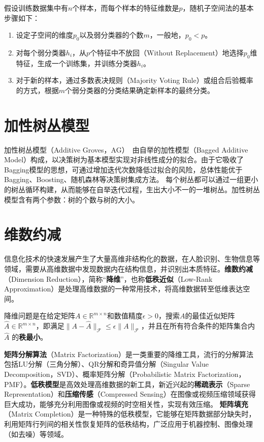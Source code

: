 假设训练数据集中有$n$个样本，而每个样本的特征维数是$p$，随机子空间法的基本步骤如下：
\begin{enumerate}[（1）]
  \item 设定子空间的维度$p_0$以及弱分类器的个数$m$，一般地，$p_0 < p$。
  \item 对每个弱分类器$h_i$，从$p$个特征中不放回（Without Replacement）地选择$p_0$维特征，生成一个训练集，并训练分类器$h_i$。
  \item 对于新的样本，通过多数表决规则（Majority Voting Rule）或组合后验概率的方式，根据$m$个弱分类器的分类结果确定新样本的最终分类。
\end{enumerate}

\section{加性树丛模型}
加性树丛模型（Additive Groves，AG）~\cite{sorokina2007additive}由自举的加性模型（Bagged Additive Model）构成，以决策树为基本模型实现对非线性成分的拟合。由于它吸收了Bagging模型的思想，可通过增加迭代次数降低过拟合的风险，总体性能优于Bagging、Boosting、随机森林等决策树集成方法。
每个树丛都可以通过一组更小的树丛循环构建，从而能够在自举迭代过程，生出大小不一的一堆树丛。加性树丛模型含有两个参数：树的个数与树的大小。

\section{维数约减}
信息化技术的快速发展产生了大量高维非结构化的数据，在人脸识别、生物信息等领域，需要从高维数据中发现数据内在结构信息，并识别出本质特征。\textbf{维数约减}（Dimension Reduction），简称“\textbf{降维}”，也称\textbf{低秩近似}（Low-Rank Approximation）是处理高维数据的一种常用技术，将高维数据转至低维表达空间。

降维问题是在给定矩阵$A\in \mathbb R^{m\times n}$和数值精度$\epsilon>0$，搜索$A$的最佳近似矩阵$\hat A\in \mathbb R^{m\times n}$，即满足$\|A-\hat A\|_{\mathcal F} \le \epsilon \|A\|_{\mathcal F}$，并且在所有符合条件的矩阵集合内$\hat A$ 的\textbf{秩最小}。

\textbf{矩阵分解算法}（Matrix Factorization）是一类重要的降维工具，流行的分解算法包括LU分解（三角分解）、QR分解和奇异值分解（Singular Value Decomposition，SVD）、概率矩阵分解（Probabilistic Matrix Factorization，PMF）。\textbf{低秩模型}是高效处理高维数据的新工具，新近兴起的\textbf{稀疏表示}（Sparse Representation）和\textbf{压缩传感}（Compressed Sensing）在图像或视频压缩领域获得巨大成功，能够充分利用图像或视频的时空相关性，实现有效压缩。
\textbf{矩阵填充}（Matrix Completion）是一种特殊的低秩模型，它能够在矩阵数据部分缺失时，利用矩阵行列间的相关性恢复矩阵的低秩结构，广泛应用于机器控制、图像处理（如去噪）等领域。

